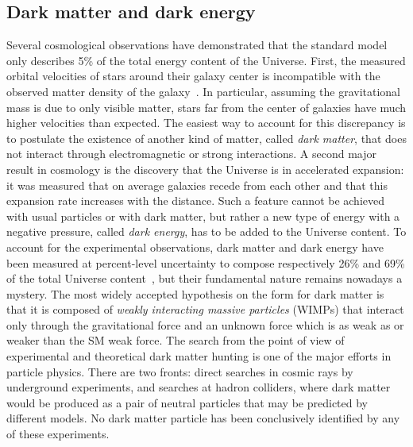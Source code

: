 \subsection*{Dark matter and dark energy}

Several cosmological observations have demonstrated that the standard model only describes 5\% of the total energy content of the Universe.
First, the measured orbital velocities of stars around their galaxy center is incompatible with the observed matter density of the galaxy~\cite{DarkMatterRubin,Iocco:2015xga}.
In particular, assuming the gravitational mass is due to only visible matter, stars far from the center of galaxies have much higher velocities than expected. %
The easiest way to account for this discrepancy is to postulate the existence of another kind of matter, called \textit{dark matter}, that does not interact through electromagnetic or strong interactions.
A second major result in cosmology is the discovery that the Universe is in accelerated expansion: it was measured that on average galaxies recede from each other and that this expansion rate increases with the distance.
Such a feature cannot be achieved with usual particles or with dark matter, but rather a new type of energy with a negative pressure, called \textit{dark energy}, has to be added to the Universe content.
To account for the experimental observations, dark matter and dark energy have been measured at percent-level uncertainty to compose respectively 26\% and 69\% of the total Universe content~\cite{Ade:2015xua}, but their fundamental nature remains nowadays a mystery.
The most widely accepted hypothesis on the form for dark matter is that it is composed of \textit{weakly interacting massive particles} (WIMPs) that interact only through the gravitational force and an unknown force which is as weak as or weaker than the SM weak force.
The search from the point of view of experimental and theoretical dark matter hunting is one of the major efforts in particle physics.
There are two fronts: direct searches in cosmic rays by underground experiments, and searches at hadron colliders, where dark matter would be produced as a pair of neutral particles that may be predicted by different models.
No dark matter particle has been conclusively identified by any of these experiments.


